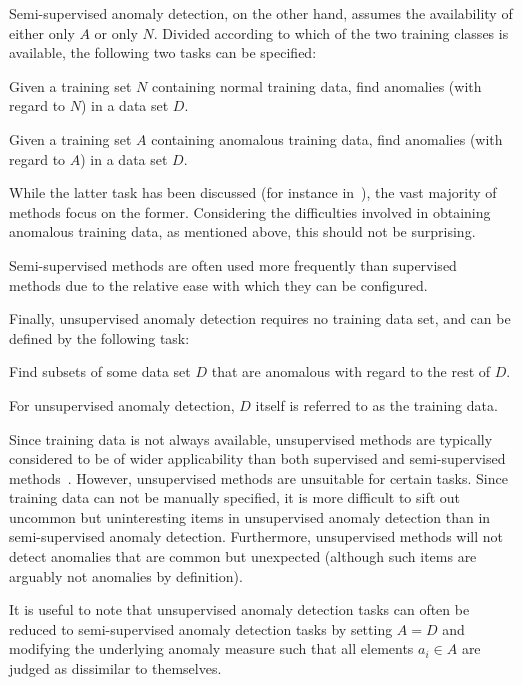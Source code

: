 Semi-supervised anomaly detection, on the other hand, assumes the availability of either only $A$ or only $N$. Divided according to which of the two training classes is available, the following two tasks can be specified:
\begin{task}
  Given a training set $N$ containing normal training data, find anomalies (with regard to $N$) in a data set $D$.
\end{task}
\begin{task}
\label{task:semisupervised_anomaly_detection}
  Given a training set $A$ containing anomalous training data, find anomalies (with regard to $A$) in a data set $D$.
\end{task}

While the latter task has been discussed (for instance in~\cite{dasgupta}), the vast majority of methods focus on the former. Considering the difficulties involved in obtaining anomalous training data, as mentioned above, this should not be surprising.

Semi-supervised methods are often used more frequently than supervised methods due to the relative ease with which they can be configured.

Finally, unsupervised anomaly detection requires no training data set, and can be defined by the following task:
\begin{task}
\label{task:unsupervised_anomaly_detection}
  Find subsets of some data set $D$ that are anomalous with regard to the rest of $D$.
\end{task}

For unsupervised anomaly detection, $D$ itself is referred to as the training data.

Since training data is not always available, unsupervised methods are typically considered to be of wider applicability than both supervised and semi-supervised methods~\cite{chandola}. However, unsupervised methods are unsuitable for certain tasks. Since training data can not be manually specified, it is more difficult to sift out uncommon but uninteresting items in unsupervised anomaly detection than in semi-supervised anomaly detection. Furthermore, unsupervised methods will not detect anomalies that are common but unexpected (although such items are arguably not anomalies by definition).

It is useful to note that unsupervised anomaly detection tasks can often be reduced to semi-supervised anomaly detection tasks by setting $A = D$ and modifying the underlying anomaly measure such that all elements $a_i \in A$ are judged as dissimilar to themselves.

